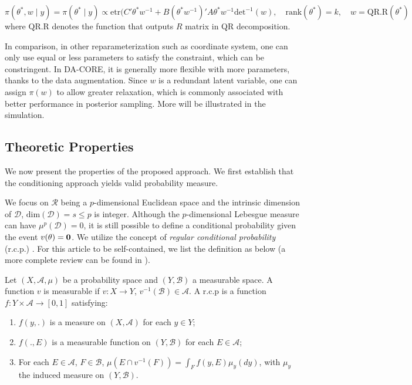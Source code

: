 \documentclass[10pt,fleqn]{article}
\newcommand{\mc}[1]{\mathcal{#1}}
\DeclareMathOperator{\1}{\mathbbm{1}}
\begin{document}
$$\pi(\theta^*, w\mid y) =\pi(\theta^*\mid y)\propto \text{etr}(C'\theta^*w^{-1}+B(\theta^*w^{-1})'A\theta^*w^{-1} \text{det}^{-1}(w), \quad \text{rank}(\theta^*)=k, \quad w= \text{QR.R}(\theta^*)$$
where $\text{QR.R}$ denotes the function that outputs $R$ matrix in QR decomposition.

In comparison, in other reparameterization such as coordinate system, one can only use equal or less parameters to satisfy the constraint, which can
be  constringent. In DA-CORE, it is generally
more flexible with more parameters, thanks to the data augmentation. Since $w$ is a redundant latent variable, one can
assign $\pi(w)$ to allow greater relaxation, which is commonly associated
with better performance in posterior sampling. More will be illustrated in
the simulation.


 \subsection{Theoretic Properties}

We now present the properties of the proposed approach. We first establish
that the conditioning approach yields valid probability measure.

We focus on $\mc R$ being a $p$-dimensional Euclidean space and the
intrinsic dimension of $\mc D$, $\mbox{dim}(\mc D)=s\le p$  is integer.
Although the
$p$-dimensional Lebesgue measure can have $\mu^p(\mc D)=0$, it is still possible to define a conditional probability given the event ${v(\theta)=\bf 0}$. We utilize the concept of {\it regular
conditional probability} (r.c.p.)
\citep{kolmogorov1950foundations}. For this article to be self-contained,
we list the definition as below (a more complete review can be found in \cite{leao2004regular}).

Let $(X, \mathscr A, \mu)$ be a probability space and $(Y, \mathscr B)$ a measurable space. A function $v$ is measurable if $v:X\rightarrow Y$, $v^{-1}(\mathscr B)\in \mathscr A$.
A r.c.p is a function
$f: Y\times \mathscr A \rightarrow[0,1]$ satisfying:

\begin{enumerate}
        \item $f(y, .)$ is a measure on $(X,\mathscr A)$ for each $y \in
        Y$;
        \item $f(., E)$ is a measurable function on $(Y,\mathscr B)$ for each $E\in \mathscr A$;
        \item For each $E \in \mathscr A$, $F\in \mathscr B$,
        $\mu(E \cap v^{-1}(F))=\int_{F} f(y, E) \mu_y(dy)$, with
        $\mu_y$ the induced measure on $(Y,\mathscr B)$.
\end{enumerate}
\end{document}
